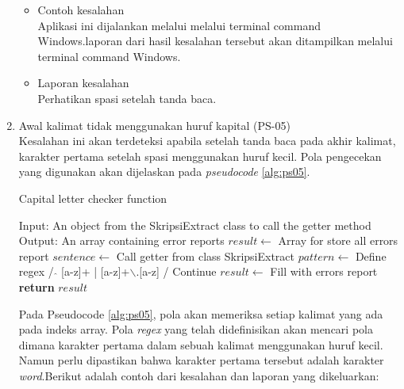 \begin{enumerate}
	\begin{itemize}
		\item Contoh kesalahan \\
		Aplikasi ini dijalankan melalui melalui terminal command Windows.laporan dari hasil kesalahan tersebut akan ditampilkan melalui terminal command Windows.
		\item Laporan kesalahan \\
		Perhatikan spasi setelah tanda baca.
	\end{itemize}
	
	\item Awal kalimat tidak menggunakan huruf kapital (PS-05) \\
	Kesalahan ini akan terdeteksi apabila setelah tanda baca pada akhir kalimat, karakter pertama setelah spasi menggunakan huruf kecil. Pola pengecekan yang digunakan akan dijelaskan pada \textit{pseudocode} \ref{alg:ps05}.

\begin{minipage}{1.0\linewidth}
\begin{algorithm}[H]
    \caption{Capital letter checker function}
	\label{alg:ps05}
	\begin{algorithmic}[1]
		\State Input: An object from the SkripsiExtract class to call the getter method
		\State Output: An array containing error reports	    	
    		\State $result \gets$ Array for store all errors report
			\State $sentence \gets$ Call getter from class SkripsiExtract
			\State    		
				\State $pattern \gets$ Define regex / $\hat{}$ [a-z]+ | [a-z]+$\backslash$.[a-z] /
        				\State Continue
        			\EndIf{}
        			\Else
                		\State $result \gets$ Fill with errors report
            	\EndIf
        	\EndFor
    		\State \textbf{return} $result$
    	\EndFunction
	\end{algorithmic}
\end{algorithm}
\end{minipage}
\medskip

	Pada Pseudocode \ref{alg:ps05}, pola akan memeriksa setiap kalimat yang ada pada indeks array. Pola \textit{regex} yang telah didefinisikan akan mencari pola dimana karakter pertama dalam sebuah kalimat menggunakan huruf kecil. Namun perlu dipastikan bahwa karakter pertama tersebut adalah karakter \textit{word}.Berikut adalah contoh dari kesalahan dan laporan yang dikeluarkan:
	

\end{enumerate}
